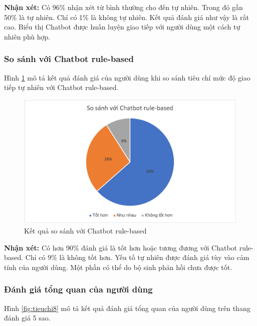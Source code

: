 \textbf{Nhận xét:}
Có 96\% nhận xét từ bình thường cho đến tự nhiên. Trong đó gần 50\% là tự nhiên. Chỉ có 1\% là không tự nhiên. Kết quả đánh giá như vậy là rất cao. Biểu thị Chatbot được huấn luyện giao tiếp với người dùng một cách tự nhiên phù hợp.

\subsubsection{So sánh với Chatbot rule-based}
Hình \ref{fig:tieuchi72} mô tả kết quả đánh giá của người dùng khi so sánh tiêu chí mức độ giao tiếp tự nhiên với Chatbot rule-based.

\begin{center}
    \begin{figure}[h!]
        \begin{center}
         \includegraphics[scale=0.91]{chapter7/img/tieuchi7_2.png}
        \end{center}
        \caption{Kết quả so sánh với Chatbot rule-based}
        \label{fig:tieuchi72}
    \end{figure}
\end{center}

\textbf{Nhận xét:}
Có hơn 90\% đánh giá là tốt hơn hoặc tương đương với Chatbot rule-based. Chỉ có 9\% là không tốt hơn. Yếu tố tự nhiên được đánh giá tùy vào cảm tính của người dùng. Một phần có thể do bộ sinh phản hồi chưa được tốt.

\subsubsection{Đánh giá tổng quan của người dùng}
Hình \ref{fig:tieuchi8} mô tả kết quả đánh giá tổng quan của người dùng trên thang đánh giá 5 sao.

